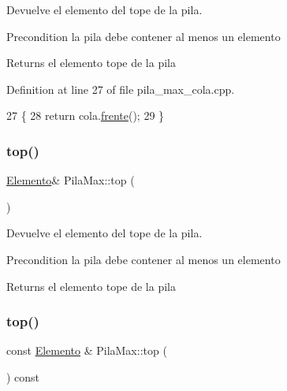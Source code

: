 Devuelve el elemento del tope de la pila. 

\begin{DoxyPrecond}{Precondition}
la pila debe contener al menos un elemento 
\end{DoxyPrecond}
\begin{DoxyReturn}{Returns}
el elemento tope de la pila 
\end{DoxyReturn}


Definition at line 27 of file pila\+\_\+max\+\_\+cola.\+cpp.


\begin{DoxyCode}
27                        \{
28   \textcolor{keywordflow}{return} cola.\hyperlink{classCola_a1df4ad2b50116ef22e77ad3f77b02d29}{frente}();
29 \}
\end{DoxyCode}
\mbox{\label{classPilaMax_a454bac8dc912314714a683c66b23fb86}} 
\subsubsection{\texorpdfstring{top()}{top()}\hspace{0.1cm}{\footnotesize\ttfamily [2/4]}}
{\footnotesize\ttfamily \hyperlink{structElemento}{Elemento}\& Pila\+Max\+::top (\begin{DoxyParamCaption}{ }\end{DoxyParamCaption})}



Devuelve el elemento del tope de la pila. 

\begin{DoxyPrecond}{Precondition}
la pila debe contener al menos un elemento 
\end{DoxyPrecond}
\begin{DoxyReturn}{Returns}
el elemento tope de la pila 
\end{DoxyReturn}
\mbox{\label{classPilaMax_a78059a1c7a74ccbc9107aec59977b83c}} 
\subsubsection{\texorpdfstring{top()}{top()}\hspace{0.1cm}{\footnotesize\ttfamily [3/4]}}
{\footnotesize\ttfamily const \hyperlink{structElemento}{Elemento} \& Pila\+Max\+::top (\begin{DoxyParamCaption}{ }\end{DoxyParamCaption}) const}



